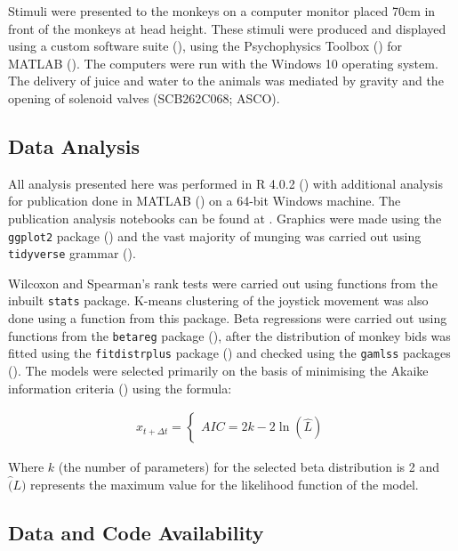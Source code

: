 Stimuli were presented to the monkeys on a computer monitor placed 70cm in front of the monkeys at head height. These stimuli were produced and displayed using a custom software suite (\cite{paper_supplement}), using the Psychophysics Toolbox (\cite{Kleiner2007}) for MATLAB (\cite{MATLAB}). The computers were run with the Windows 10 operating system. The delivery of juice and water to the animals was mediated by gravity and the opening of solenoid valves (SCB262C068; ASCO).

\subsection{Data Analysis}

All analysis presented here was performed in R 4.0.2 (\cite{rcore}) with additional analysis for publication done in MATLAB (\cite{MATLAB}) on a 64-bit Windows machine. The publication analysis notebooks can be found at \cite{paper_supplement}. Graphics were made using the \texttt{ggplot2} package (\cite{Wickham2016}) and the vast majority of munging was carried out using \texttt{tidyverse} grammar (\cite{Wickham2019}).

Wilcoxon and Spearman’s rank tests were carried out using functions from the inbuilt \texttt{stats} package. K-means clustering of the joystick movement was also done using a function from this package. Beta regressions were carried out using functions from the \texttt{betareg} package (\cite{cribarinetoBetaRegression2010}), after the distribution of monkey bids was fitted using the \texttt{fitdistrplus} package (\cite{delignettemullerFitdistrplusPackageFitting2015}) and checked using the \texttt{gamlss} packages (\cite{stasinopoulosGeneralizedAdditiveModels2007}). The models were selected primarily on the basis of minimising the Akaike information criteria (\cite{akaike1974new}) using the formula:

\begin{equation}
\begin{aligned}
x_{t+\Delta t} = 
\begin{cases}
AIC = 2k - 2\ln(\hat{L})
\end{cases}
\end{aligned}
\label{eq:AIC}
\end{equation}

Where $k$ (the number of parameters) for the selected beta distribution is 2 and $\hat(L)$ represents the maximum value for the likelihood function of the model.

\subsection{Data and Code Availability}

